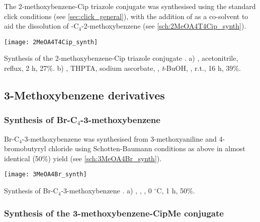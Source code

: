 The 2-methoxybenzene-Cip triazole conjugate  was synthesised using the standard click conditions  (see \ref{sec:click_general}), with the addition of  as a co-solvent to aid the dissolution of -C$_4$-2-methoxybenzene  (see \ref{sch:2MeOA4T4Cip_synth}).

\begin{scheme}[H]
	\begin{center}
				\texttt{[image: 2MeOA4T4Cip\_synth]}
		\caption{Synthesis of the 2-methoxybenzene-Cip triazole conjugate . 
		a) , acetonitrile, reflux, 2 h, 27\%. 
		b) , THPTA, sodium ascorbate, , \textit{t}-BuOH, , r.t., 16 h, 39\%.\label{sch:2MeOA4T4Cip_synth}}
	\end{center}
\end{scheme}

\subsection{3-Methoxybenzene derivatives}

\subsubsection{Synthesis of Br-C$_4$-3-methoxybenzene }

Br-C$_4$-3-methoxybenzene  was synthesised from 3-methoxyaniline  and 4-bromobutyryl chloride  using Schotten-Baumann conditions as above in almost identical (50\%) yield (see \ref{sch:3MeOA4Br_synth}). 

\begin{scheme}[H]
	\begin{center}
		\texttt{[image: 3MeOA4Br\_synth]}
		\caption{Synthesis of Br-C$_4$-3-methoxybenzene .
			a) , , , 0 $^{\circ}$C, 1 h, 50\%. \label{sch:3MeOA4Br_synth}}
	\end{center}
\end{scheme}

\subsubsection{Synthesis of the 3-methoxybenzene-CipMe conjugate }

